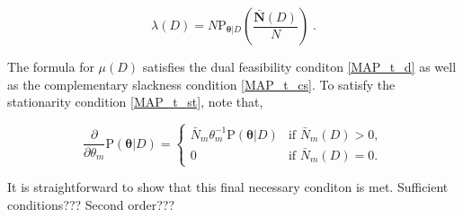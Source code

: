 \documentclass[12pt]{report}
\begin{document}
\begin{equation}
\lambda(D) =  N \text{P}_{\bm{\theta} | D} \left( \frac{\bar{\bm{N}}(D)}{N} \right) \;.
\end{equation}

The formula for $\mu(D)$ satisfies the dual feasibility conditon \eqref{MAP_t_d} as well as the complementary slackness condition \eqref{MAP_t_cs}. To satisfy the stationarity condition \eqref{MAP_t_st}, note that,

\begin{equation}
\frac{\partial}{\partial \theta_m} \text{P}(\bm{\theta} | D) = \begin{cases} \bar{N}_m \theta_m^{-1} \text{P}(\bm{\theta} | D) & \text{if } \bar{N}_m(D) > 0, \\ 0 & \text{if } \bar{N}_m(D) = 0. \end{cases}
\end{equation}

It is straightforward to show that this final necessary conditon is met. Sufficient conditions??? Second order???

\end{document}
